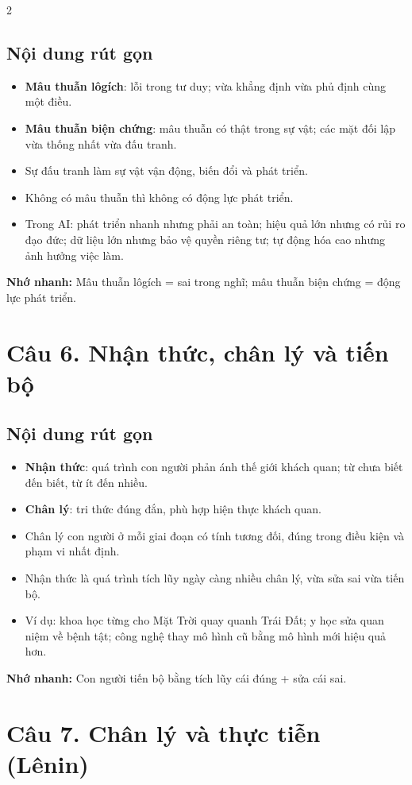 \documentclass[9pt,a4paper]{extarticle}
\begin{document}
\begin{multicols*}{2}
\subsection*{Nội dung rút gọn}
\begin{itemize}
  \item \textbf{Mâu thuẫn lôgích}: lỗi trong tư duy; vừa khẳng định vừa phủ định cùng một điều.
  \item \textbf{Mâu thuẫn biện chứng}: mâu thuẫn có thật trong sự vật; các mặt đối lập vừa thống nhất vừa đấu tranh.
  \item Sự đấu tranh làm sự vật vận động, biến đổi và phát triển.
  \item Không có mâu thuẫn thì không có động lực phát triển.
  \item Trong AI: phát triển nhanh nhưng phải an toàn; hiệu quả lớn nhưng có rủi ro đạo đức; dữ liệu lớn nhưng bảo vệ quyền riêng tư; tự động hóa cao nhưng ảnh hưởng việc làm.
\end{itemize}
\textbf{Nhớ nhanh:} Mâu thuẫn lôgích = sai trong nghĩ; mâu thuẫn biện chứng = động lực phát triển.

\section*{Câu 6. Nhận thức, chân lý và tiến bộ}
\subsection*{Nội dung rút gọn}
\begin{itemize}
  \item \textbf{Nhận thức}: quá trình con người phản ánh thế giới khách quan; từ chưa biết đến biết, từ ít đến nhiều.
  \item \textbf{Chân lý}: tri thức đúng đắn, phù hợp hiện thực khách quan.
  \item Chân lý con người ở mỗi giai đoạn có tính tương đối, đúng trong điều kiện và phạm vi nhất định.
  \item Nhận thức là quá trình tích lũy ngày càng nhiều chân lý, vừa sửa sai vừa tiến bộ.
  \item Ví dụ: khoa học từng cho Mặt Trời quay quanh Trái Đất; y học sửa quan niệm về bệnh tật; công nghệ thay mô hình cũ bằng mô hình mới hiệu quả hơn.
\end{itemize}
\textbf{Nhớ nhanh:} Con người tiến bộ bằng tích lũy cái đúng + sửa cái sai.

\section*{Câu 7. Chân lý và thực tiễn (Lênin)}

\end{multicols*}
\end{document}

